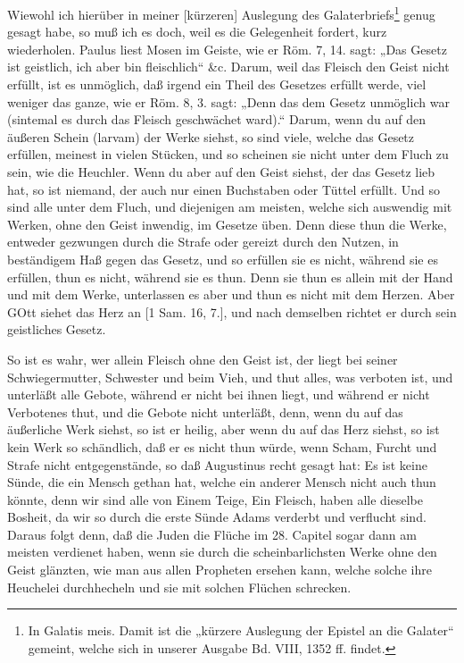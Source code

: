 Wiewohl ich hierüber in meiner [kürzeren] Auslegung des Galaterbriefs\footnote{In Galatis meis. Damit ist die „kürzere Auslegung der Epistel an die Galater“ gemeint, welche sich in unserer Ausgabe Bd. VIII, 1352 ff. findet.} genug gesagt habe, so muß ich es doch, weil es die Gelegenheit fordert, kurz wiederholen. Paulus liest Mosen im Geiste, wie er Röm. 7, 14. sagt: „Das Gesetz ist geistlich, ich aber bin fleischlich“ \&c. Darum, weil das Fleisch den Geist nicht erfüllt, ist es unmöglich, daß irgend ein Theil des Gesetzes erfüllt werde, viel weniger das ganze, wie er Röm. 8, 3. sagt: „Denn das dem Gesetz unmöglich war (sintemal es durch das Fleisch geschwächet ward).“ Darum, wenn du auf den äußeren Schein (larvam) der Werke siehst, so sind viele, welche das Gesetz erfüllen, meinest in vielen Stücken, und so scheinen sie nicht unter dem Fluch zu sein, wie die Heuchler. Wenn du aber auf den Geist siehst, der das Gesetz lieb hat, so ist niemand, der auch nur einen Buchstaben oder Tüttel erfüllt. Und so sind alle unter dem Fluch, und diejenigen am meisten, welche sich auswendig mit Werken, ohne den Geist inwendig, im Gesetze üben. Denn diese thun die Werke, entweder gezwungen durch die Strafe oder gereizt durch den Nutzen, in beständigem Haß gegen das Gesetz, und so erfüllen sie es nicht, während sie es erfüllen, thun es nicht, während sie es thun. Denn sie thun es allein mit der Hand und mit dem Werke, unterlassen es aber und thun es nicht mit dem Herzen. Aber GOtt siehet das Herz an [1 Sam. 16, 7.], und nach demselben richtet er durch sein geistliches Gesetz.

So ist es wahr, wer allein Fleisch ohne den Geist ist, der liegt bei seiner Schwiegermutter, Schwester und beim Vieh, und thut alles, was verboten ist, und unterläßt alle Gebote, während er nicht bei ihnen liegt, und während er nicht Verbotenes thut, und die Gebote nicht unterläßt, denn, wenn du auf das äußerliche Werk siehst, so ist er heilig, aber wenn du auf das Herz siehst, so ist kein Werk so schändlich, daß er es nicht thun würde, wenn Scham, Furcht und Strafe nicht entgegenstände, so daß Augustinus recht gesagt hat: Es ist keine Sünde, die ein Mensch gethan hat, welche ein anderer Mensch nicht auch thun könnte, denn wir sind alle von Einem Teige, Ein Fleisch, haben alle dieselbe Bosheit, da wir so durch die erste Sünde Adams verderbt und verflucht sind. Daraus folgt denn, daß die Juden die Flüche im 28. Capitel sogar dann am meisten verdienet haben, wenn sie durch die scheinbarlichsten Werke ohne den Geist glänzten, wie man aus allen Propheten ersehen kann, welche solche ihre Heuchelei durchhecheln und sie mit solchen Flüchen schrecken.

